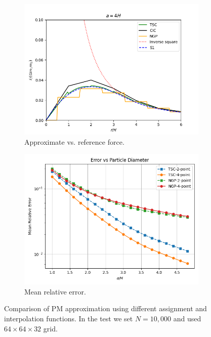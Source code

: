 \begin{figure}[htp]
    \centering
    \begin{subfigure}[b]{0.48\textwidth}
        \centering
        \includegraphics[width=\textwidth]{img/field_different_ass.png}
        \caption{Approximate vs. reference force.}
        \label{fig:reference-force-approx-different-schemes-sub}
    \end{subfigure}
    \hfill
    \begin{subfigure}[b]{0.48\textwidth}
        \centering
        \includegraphics[width=\textwidth]{img/no-cic.png}
        \caption{Mean relative error.}
        \label{fig:reference-force-error-different-schemes-sub}
    \end{subfigure}
    \caption{Comparison of PM approximation using different assignment and interpolation functions.
    In the test we set $N=10{,}000$ and used $64\times 64\times 32$ grid.
    }
    \label{fig:reference-force-err-schemes-combined}
\end{figure}
